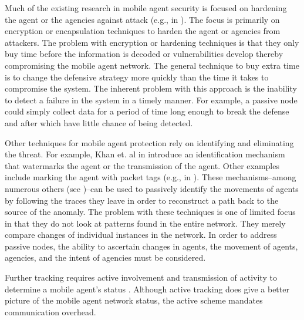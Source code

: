 \documentclass{acm_proc_article-sp}
\begin{document}
Much of the existing research in mobile agent security is focused on hardening the agent or the agencies against attack (e.g., in \cite{lee04, lin10}).  The focus is primarily on encryption or encapsulation techniques to harden the agent or agencies from attackers.  The problem with encryption or hardening techniques is that they only buy time before the information is decoded or vulnerabilities develop thereby compromising the mobile agent network.  The general technique to buy extra time is to change the defensive strategy more quickly than the time it takes to compromise the system.  The inherent problem with this approach is the inability to detect a failure in the system in a timely manner.  For example, a passive node could simply collect data for a period of time long enough to break the defense and after which have little chance of being detected.

Other techniques for mobile agent protection rely on identifying and eliminating the threat.  For example, Khan et. al in \cite{khan08} introduce an identification mechanism that watermarks the agent or the transmission of the agent.  Other examples include marking the agent with packet tags (e.g., in \cite{duwairi04, goodrich02, peng07}).  These mechanisms--among numerous others (see \cite{bhavani10, gao05})--can be used to passively identify the movements of agents by following the traces they leave in order to reconstruct a path back to the source of the anomaly.  The problem with these techniques is one of limited focus in that they do not look at patterns found in the entire network.  They merely compare changes of individual instances in the network.  In order to address passive nodes, the ability to ascertain changes in agents, the movement of agents, agencies, and the intent of agencies must be considered.

Further tracking requires active involvement and transmission of activity to determine a mobile agent's status \cite{sreedevi09}.  Although active tracking does give a better picture of the mobile agent network status, the active scheme mandates communication overhead.
\end{document}
